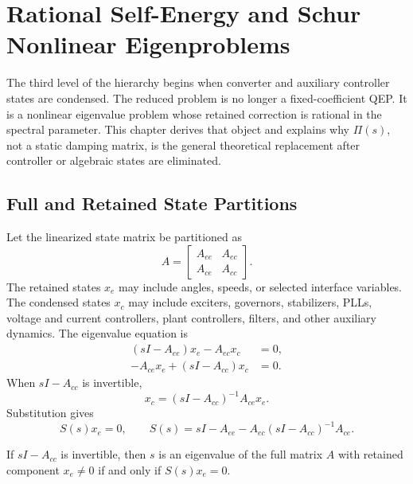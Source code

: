 \chapter{Rational Self-Energy and Schur Nonlinear Eigenproblems}

The third level of the hierarchy begins when converter and auxiliary controller
states are condensed. The reduced problem is no longer a fixed-coefficient QEP.
It is a nonlinear eigenvalue problem whose retained correction is rational in
the spectral parameter. This chapter derives that object and explains why
\(\Pi(s)\), not a static damping matrix, is the general theoretical replacement
after controller or algebraic states are eliminated.

\section{Full and Retained State Partitions}

Let the linearized state matrix be partitioned as
\begin{equation}
  A=
  \begin{bmatrix}
    A_{ee} & A_{ec}\\
    A_{ce} & A_{cc}
  \end{bmatrix}.
  \label{eq:self_full_partition}
\end{equation}
The retained states \(x_e\) may include angles, speeds, or selected interface
variables. The condensed states \(x_c\) may include exciters, governors,
stabilizers, PLLs, voltage and current controllers, plant controllers, filters,
and other auxiliary dynamics. The eigenvalue equation is
\begin{align}
  (sI-A_{ee})x_e-A_{ec}x_c &=0,\\
  -A_{ce}x_e+(sI-A_{cc})x_c &=0.
\end{align}
When \(sI-A_{cc}\) is invertible,
\begin{equation}
  x_c=(sI-A_{cc})^{-1}A_{ce}x_e.
\end{equation}
Substitution gives
\begin{equation}
  S(s)x_e=0,\qquad
  S(s)=sI-A_{ee}-A_{ec}(sI-A_{cc})^{-1}A_{ce}.
  \label{eq:self_schur_operator}
\end{equation}

\begin{proposition}
If \(sI-A_{cc}\) is invertible, then \(s\) is an eigenvalue of the full matrix
\(A\) with retained component \(x_e\ne0\) if and only if \(S(s)x_e=0\).
\end{proposition}

